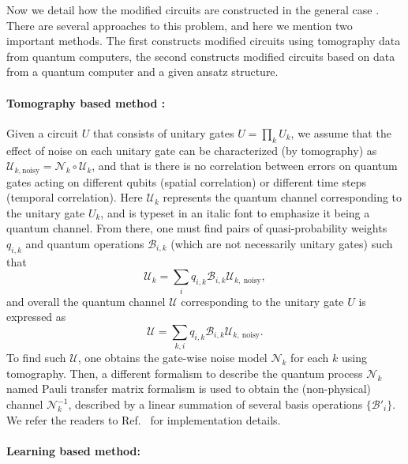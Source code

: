 Now we detail how the modified circuits are constructed in the general case \cite{endoPracticalQuantumError2018,strikisLearningbasedQuantumError2020,Takagi2021OptimalResource}. There are several approaches to this problem, and here we mention two important methods. The first constructs modified circuits using tomography data from quantum computers, the second constructs modified circuits based on data from a quantum computer and a given ansatz structure.

\paragraph{Tomography based method  \cite{endoPracticalQuantumError2018}:} Given a circuit $U$ that consists of unitary gates $U=\prod _{k} U_{k}$, we assume that the effect of noise on each unitary gate can be characterized (by tomography) as $\mathcal{U}_{k,\mathrm{noisy}} =\mathcal{N}_{k} \circ \mathcal{U}_{k}$, and that is there is no correlation between errors on quantum gates acting on different qubits (spatial correlation) or different time steps (temporal correlation).
Here $\mathcal{U}_k$ represents the quantum channel corresponding to the unitary gate $U_k$, and is typeset in an italic font to emphasize it being a quantum channel.
From there, one must find pairs of quasi-probability weights $q_{i,k}$ and quantum operations $\mathcal{B}_{i,k}$ (which are not necessarily unitary gates) such that
\begin{equation}
    \label{eq:mit-pec-6_3}
    \mathcal{U}_{k} =\sum _{i} q_{i,k} \mathcal{B}_{i,k} \mathcal{U}_{k,\ \text{noisy}},
\end{equation}
and overall the quantum channel $\mathcal{U}$ corresponding to the unitary gate $U$ is expressed as
\begin{equation}
    \label{eq:mit-pec-7}
    \mathcal{U} =\sum_{k,i} q_{i,k} \mathcal{B}_{i,k} \mathcal{U}_{k,\ \text{noisy}} .
\end{equation}
To find such $\mathcal{U}$, one obtains the gate-wise noise model $\mathcal{N}_k$ for each $k$ using tomography. Then, a different formalism to describe the quantum process $\mathcal{N}_k$ named Pauli transfer matrix formalism is used to obtain the (non-physical) channel $\mathcal{N}^{-1}_k$, described by a linear summation of several basis operations $\{\mathcal{B}'_{i}\}$. We refer the readers to Ref.~\cite{endoPracticalQuantumError2018} for implementation details.

\paragraph{Learning based method:}

